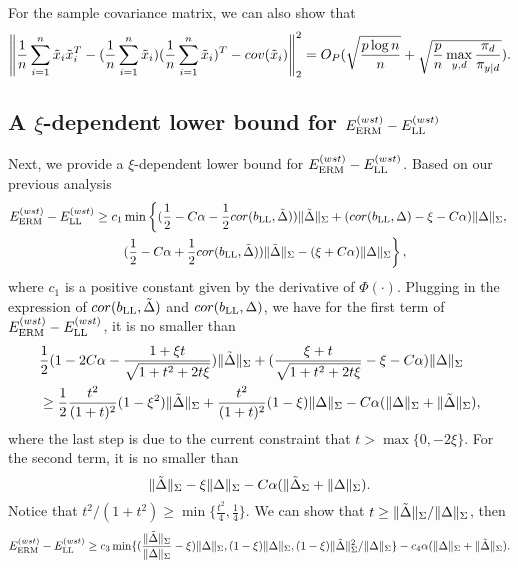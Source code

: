For the sample covariance matrix, we can also show that
\[
   \left\|\frac{1}{n}\sum_{i=1}^n\tilde{x}_i\tilde{x}_i^T-(\frac{1}{n}\sum_{i=1}^n\tilde{x}_i)(\frac{1}{n}\sum_{i=1}^n\tilde{x}_i)^T-cov(\tilde{x}_i)\right\|_2^2=O_P(\sqrt{\frac{p\log n}{n}}+\sqrt{\frac{p}{n}\max_{y,d}\frac{\pi_d}{\pi_{y|d}}}).
\]

\subsection{A $\xi$-dependent lower bound for $E^{(wst)}_{\textup{ERM}}-E^{(wst)}_{\textup{LL}}$}
Next, we provide a $\xi$-dependent lower bound for $E^{(wst)}_{\textup{ERM}}-E^{(wst)}_{\textup{LL}}$. Based on our previous analysis
\begin{align*}
 E^{(wst)}_{\textup{ERM}}-E^{(wst)}_{\textup{LL}}&\geq c_1\min\left\{(\frac{1}{2}-C\alpha-\frac{1}{2}cor(b_{\textup{LL}},\tilde{\Delta}))\|\tilde{\Delta}\|_{\Sigma}+(cor(b_{\textup{LL}},\Delta)-\xi-C\alpha)\|\Delta\|_{\Sigma},\right.\\
 &\quad\quad \left.(\frac{1}{2}-C{\alpha}+\frac{1}{2}cor(b_{\textup{LL}},\tilde{\Delta}))\|\tilde{\Delta}\|_{\Sigma}-(\xi+C\alpha)\|\Delta\|_{\Sigma}\right\},   
\end{align*}
where $c_1$ is a positive constant given by the derivative of $\Phi(\cdot)$. 
Plugging in the expression of $cor(b_{\textup{LL}},\tilde{\Delta})$ and $cor(b_{\textup{LL}},\Delta)$, we have for the first term of $E^{(wst)}_{\textup{ERM}}-E^{(wst)}_{\textup{LL}}$, it is no smaller than
\begin{align*}
&\frac{1}{2}(1-2C\alpha-\frac{1+\xi t}{\sqrt{1+t^2+2t\xi}})\|\tilde{\Delta}\|_{\Sigma}+(\frac{\xi+t}{\sqrt{1+t^2+2t\xi}}-\xi-C\alpha)\|\Delta\|_{\Sigma}\\
&\geq \frac{1}{2}\frac{t^2}{(1+t)^2}(1-\xi^2)\|\tilde{\Delta}\|_{\Sigma}+\frac{t^2}{(1+t)^2}(1-\xi)\|\Delta\|_{\Sigma}-C\alpha(\|\Delta\|_{\Sigma}+\|\tilde{\Delta}\|_{\Sigma}),
\end{align*}
where the last step is due to the current constraint that $t>\max\{0,-2\xi\}$. For the second term, it is no smaller than
\[
  \|\tilde{\Delta}\|_{\Sigma}-\xi\|\Delta\|_{\Sigma}-C\alpha(\|\tilde{\Delta}_{\Sigma}+\|\Delta\|_{\Sigma}).
\]
Notice that $t^2/(1+t^2)\geq \min\{\frac{t^2}{4},\frac{1}{4}\}$. We can show that $t\geq \|\tilde{\Delta}\|_{\Sigma}/\|\Delta\|_{\Sigma}$, then
\begin{align*}
  E^{(wst)}_{\textup{ERM}}-E^{(wst)}_{\textup{LL}}\geq c_3\min\{(\frac{\|\tilde{\Delta}\|_{\Sigma}}{\|\Delta\|_{\Sigma}} -\xi)\|\Delta\|_{\Sigma},(1-\xi)\|\Delta\|_{\Sigma},(1-\xi)\|\tilde{\Delta}\|_{\Sigma}^2/\|\Delta\|_{\Sigma}\}-c_4\alpha(\|\Delta\|_{\Sigma}+\|\tilde{\Delta}\|_{\Sigma}).
\end{align*}

